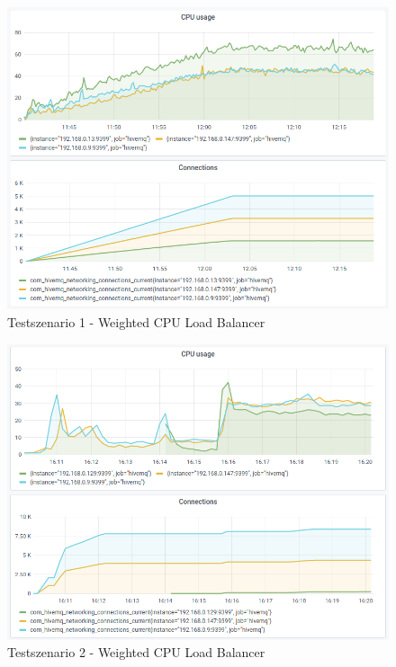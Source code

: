 \begin{figure}
    \centering
    \includegraphics[scale=0.8]{images/s1_cpu.png}
    \caption{Testszenario 1 - Weighted CPU Load Balancer}
    \label{fig:s1-cpu}
\end{figure}
\begin{figure}
    \centering
    \includegraphics[scale=0.8]{images/s2_cpu.png}
    \caption{Testszenario 2 - Weighted CPU Load Balancer}
    \label{fig:s2-cpu}
\end{figure}
